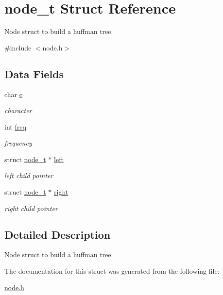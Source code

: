 \hypertarget{structnode__t}{}\section{node\+\_\+t Struct Reference}
\label{structnode__t}


Node struct to build a huffman tree.  




{\ttfamily \#include $<$node.\+h$>$}

\subsection*{Data Fields}
\begin{DoxyCompactItemize}
\item 
\hypertarget{structnode__t_a7f633b088a3b91fb5db93deb4523ea1a}{}char \hyperlink{structnode__t_a7f633b088a3b91fb5db93deb4523ea1a}{c}\label{structnode__t_a7f633b088a3b91fb5db93deb4523ea1a}

\begin{DoxyCompactList}\small\item\em character \end{DoxyCompactList}\item 
\hypertarget{structnode__t_a9e42b84da748936e09ca0bb534f21cbc}{}int \hyperlink{structnode__t_a9e42b84da748936e09ca0bb534f21cbc}{freq}\label{structnode__t_a9e42b84da748936e09ca0bb534f21cbc}

\begin{DoxyCompactList}\small\item\em frequency \end{DoxyCompactList}\item 
\hypertarget{structnode__t_ac08d5277af93a445d358059e7ac81cb1}{}struct \hyperlink{structnode__t}{node\+\_\+t} $\ast$ \hyperlink{structnode__t_ac08d5277af93a445d358059e7ac81cb1}{left}\label{structnode__t_ac08d5277af93a445d358059e7ac81cb1}

\begin{DoxyCompactList}\small\item\em left child pointer \end{DoxyCompactList}\item 
\hypertarget{structnode__t_ad966fa756fa1d26aca1d092126d9c9c7}{}struct \hyperlink{structnode__t}{node\+\_\+t} $\ast$ \hyperlink{structnode__t_ad966fa756fa1d26aca1d092126d9c9c7}{right}\label{structnode__t_ad966fa756fa1d26aca1d092126d9c9c7}

\begin{DoxyCompactList}\small\item\em right child pointer \end{DoxyCompactList}\end{DoxyCompactItemize}


\subsection{Detailed Description}
Node struct to build a huffman tree. 

The documentation for this struct was generated from the following file\+:\begin{DoxyCompactItemize}
\item 
\hyperlink{node_8h}{node.\+h}\end{DoxyCompactItemize}
